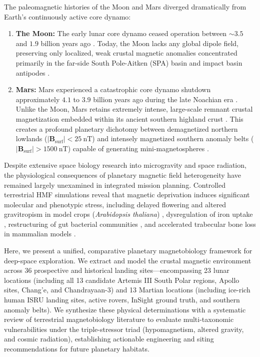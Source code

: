 The paleomagnetic histories of the Moon and Mars diverged dramatically from Earth's continuously active core dynamo:
\begin{enumerate}
    \item \textbf{The Moon:} The early lunar core dynamo ceased operation between $\sim 3.5$ and $1.9$ billion years ago \citep{Wieczorek2006}. Today, the Moon lacks any global dipole field, preserving only localized, weak crustal magnetic anomalies concentrated primarily in the far-side South Pole-Aitken (SPA) basin and impact basin antipodes \citep{Hood2020, Tsunakawa2015}.
    \item \textbf{Mars:} Mars experienced a catastrophic core dynamo shutdown approximately $4.1$ to $3.9$ billion years ago during the late Noachian era \citep{Acuna1999, Connerney2005}. Unlike the Moon, Mars retains extremely intense, large-scale remnant crustal magnetization embedded within its ancient southern highland crust \citep{Langlais2019}. This creates a profound planetary dichotomy between demagnetized northern lowlands ($|\mathbf{B}_{\text{surf}}| < \SI{25}{\nano\tesla}$) and intensely magnetized southern anomaly belts ($|\mathbf{B}_{\text{surf}}| > \SI{1500}{\nano\tesla}$) capable of generating mini-magnetospheres \citep{Mitchell2001, Johnson2020}.
\end{enumerate}

Despite extensive space biology research into microgravity and space radiation, the physiological consequences of planetary magnetic field heterogeneity have remained largely unexamined in integrated mission planning. Controlled terrestrial HMF simulations reveal that magnetic deprivation induces significant molecular and phenotypic stress, including delayed flowering and altered gravitropism in model crops (\textit{Arabidopsis thaliana}) \citep{Agliassa2018, Narayana2018}, dysregulation of iron uptake \citep{Narayana2021}, restructuring of gut bacterial communities \citep{Zhang2017}, and accelerated trabecular bone loss in mammalian models \citep{Xu2012, Mo2014}.

Here, we present a unified, comparative planetary magnetobiology framework for deep-space exploration. We extract and model the crustal magnetic environment across 36 prospective and historical landing sites—encompassing 23 lunar locations (including all 13 candidate Artemis III South Polar regions, Apollo sites, Chang'e, and Chandrayaan-3) and 13 Martian locations (including ice-rich human ISRU landing sites, active rovers, InSight ground truth, and southern anomaly belts). We synthesize these physical determinations with a systematic review of terrestrial magnetobiology literature to evaluate multi-taxonomic vulnerabilities under the triple-stressor triad (hypomagnetism, altered gravity, and cosmic radiation), establishing actionable engineering and siting recommendations for future planetary habitats.
